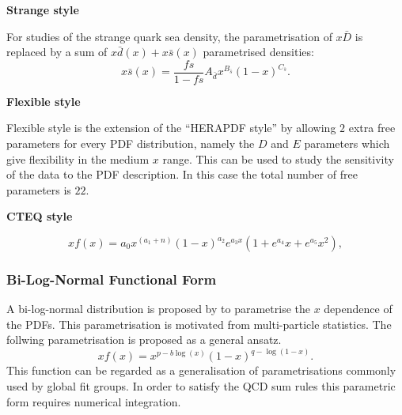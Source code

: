 \begin{description}
\item \bf{Strange style}\rm


For studies of the strange quark sea density, the parametrisation of $x\bar{D}$ is replaced by a sum of $x\bar{d}(x)+x\bar{s}(x)$ parametrised densities:
\begin{equation}
x\bar{s}(x)=\frac{fs}{1-fs} A_{\bar{d}}x^{B_{\bar{s}}}(1-x)^{C_{\bar{s}}} .
\end{equation}

\item \bf{Flexible style}\rm

Flexible style is the extension of the ``HERAPDF style'' by allowing $2$ extra free parameters for every PDF distribution, 
namely the $D$ and $E$ parameters which give flexibility in the medium $x$ range. 
This can be used to study the sensitivity of the data to the PDF description. In this case the total number of free parameters is $22$.


\item \bf{CTEQ style}\rm


\begin{equation}
 xf(x) = a_0 x^{(a_1+n)} (1-x)^{a_2} e^{a_3x} (1 + e^{a_4} x + e^{a_5} x^2),
\label{eqn:pdf_cteq}
\end{equation}
%
\end{description}

\subsubsection{Bi-Log-Normal Functional Form}
\label{sec:log}
A bi-log-normal distribution is proposed by \cite{AndreSchoening} to parametrise the $x$ dependence of the PDFs.
This parametrisation is motivated from multi-particle statistics. The follwing parametrisation is proposed as a general ansatz.
\begin{equation}
xf(x)=x^{p-b\log(x)}(1-x)^{q-\log(1-x)}.
\label{eq:AS}
\end{equation}
This function can be regarded as a generalisation of parametrisations commonly used by global fit groups.
In order to satisfy the QCD sum rules this parametric form requires numerical integration.

